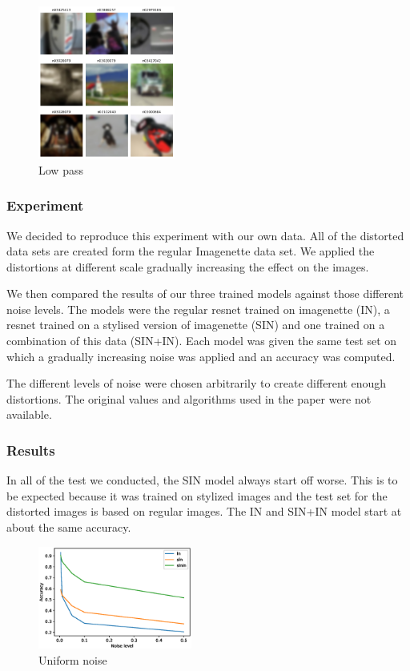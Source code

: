 \documentclass{article}
\begin{document}
\begin{figure}[h!]
\centering
\includegraphics[width = 0.4\textwidth]{imgs/image_low}
\caption{Low pass}
\end{figure}

\subsubsection{Experiment}

We decided to reproduce this experiment with our own data.
All of the distorted data sets are created form the regular Imagenette data set. We applied the distortions at different scale gradually increasing the effect on the images.

We then compared the results of our three trained models against those different noise levels.
The models were the regular resnet trained on imagenette (IN), a resnet trained on a stylised version of imagenette (SIN) and one trained on a combination of this data (SIN+IN).
Each model was given the same test set on which a gradually increasing noise was applied and an accuracy was computed.

The different levels of noise were chosen arbitrarily to create different enough distortions. The original values and algorithms used in the paper were not available.

\subsubsection{Results}

In all of the test we conducted, the SIN model always start off worse. This is to be expected because it was trained on stylized images 
and the test set for the distorted images is based on regular images. The IN and SIN+IN model start at about the same accuracy.

\begin{figure}[h!]
\centering
\includegraphics[width = 0.45\textwidth]{imgs/uniform}
\caption{Uniform noise}
\label{uniform_noise}
\end{figure}
\end{document}
